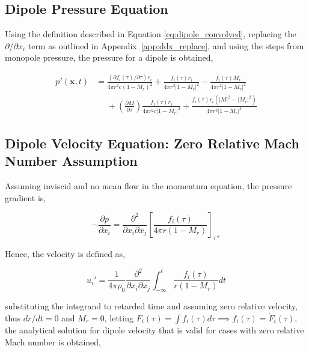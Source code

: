 \subsection{Dipole Pressure Equation} \label{subsubsec:dipole_p}

Using the definition described in Equation \ref{eq:dipole_convolved}, replacing the $\partial / \partial x_i$ term as outlined in Appendix~\ref{app:ddx_replace}, and using the steps from monopole pressure, the pressure for a dipole is obtained,

\begin{equation}
\begin{split}
    p'(\bm{x}, t) &= \frac{(\partial f_i(\tau)/\partial \tau) r_i}{4\pi r^2c(1-M_r)^2}
    + \frac{f_i(\tau)r_i}{4\pi r^3 |1-M_r|^2}
    - \frac{f_i(\tau)M_r}{4\pi r^2 |1-M_r|^2} \\
    &\phantom{=} + \left( \frac{\partial M}{\partial \tau}\right) \frac{f_i(\tau)r_i}{4\pi r^2c|1-M_r|^3}
    + \frac{f_i(\tau)r_i(|M|^2 - |M_r|^2)}{4\pi r^3 |1-M_r|^3}
    \label{eq:dipole_pressure}
\end{split}
\end{equation}


\subsection{Dipole Velocity Equation: Zero Relative Mach Number Assumption} \label{subsubsec:dipole_u1}

Assuming inviscid and no mean flow in the momentum equation, the pressure gradient is,

\begin{equation*}
    -\frac{\partial p}{\partial x_i} = 
    \frac{\partial^2}{\partial x_i \partial x_j} \left[ 
    \frac{f_i(\tau)}{4\pi r (1-M_r)}
    \right]_{\tau*}
\end{equation*}

Hence, the velocity is defined as,

\begin{equation*}
    u_i' = \frac{1}{4\pi\rho_0} \frac{\partial^2}{\partial x_i \partial x_j} \int_{-\infty}^t \frac{f_i(\tau)}{r(1-M_r)}dt
\end{equation*}

substituting the integrand to retarded time and assuming zero relative velocity, thus $dr/dt=0$ and $M_r=0$, letting $F_i(\tau) = \int f_i(\tau) d\tau \implies f_i(\tau) = \dot{F}_i(\tau)$, the analytical solution for dipole velocity that is valid for cases with zero relative Mach number is obtained,%

